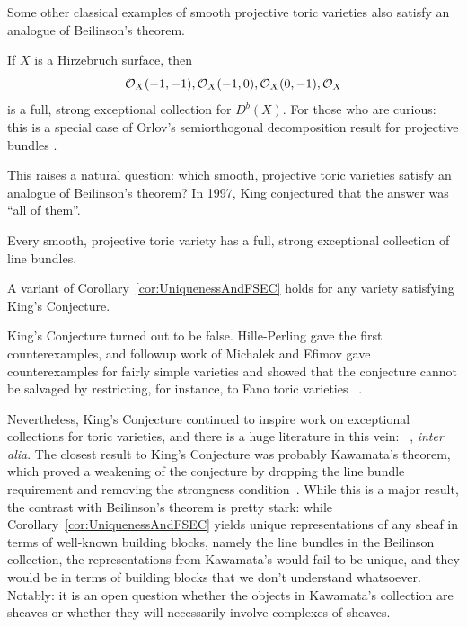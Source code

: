 \documentclass{amsart}
\begin{document}
Some other classical examples of smooth projective toric varieties also satisfy an analogue of Beilinson's theorem.
\begin{example}
If $X$ is a Hirzebruch surface, then
$$
{\mathcal O}_{X}(-1,-1),{\mathcal O}_{X}(-1,0), {\mathcal O}_{X}(0,-1),{\mathcal O}_{X}
$$
is a full, strong exceptional collection for $D^b(X)$.   For those who are curious: this is a special case of Orlov's semiorthogonal decomposition result for projective bundles \cite[Cor.~8.36]{Huybrechts2006}.
\end{example}

This raises a natural question:  which smooth, projective toric varieties satisfy an analogue of Beilinson's theorem?  In 1997, King conjectured that the answer was ``all of them''.

\begin{conj}[King, 1997]
    Every smooth, projective toric variety has a full, strong exceptional collection of line bundles.
\end{conj}

\begin{remark}
\label{rem:monad}
A variant of Corollary~\ref{cor:UniquenessAndFSEC} holds for any variety satisfying King's Conjecture. 
\end{remark} 

King's Conjecture turned out to be
false.  Hille-Perling gave the first counterexamples, and followup work of Michalek and Efimov gave counterexamples for fairly simple varieties and showed that the conjecture cannot be salvaged by restricting, for instance, to Fano toric varieties
~\cites{HP06, Michalek11a, Efimov14}.

Nevertheless, King's Conjecture
continued to inspire work on exceptional collections for toric
varieties, and there is a huge literature in this vein:
~\cites{ABK+20,
BFK19,BDL+20,BIL+26,BDM22,BT09,BH09,BO19,BW21,CM04,CM10,DLM09,Jerby15,Jerby17,Jerby20,Kawamata06,Kawamata13,LM11,OU13,PrabhuNaik17,Sanchez23,Uehara14},
\emph{inter alia}.  The closest result to King's Conjecture was probably Kawamata's theorem, which proved a weakening of the conjecture by dropping the line bundle requirement and removing the strongness condition~\cite{Kawamata06}.  While this is a major result, the contrast with Beilinson's theorem is pretty stark: while Corollary~\ref{cor:UniquenessAndFSEC} yields unique representations of any sheaf in terms of well-known building blocks, namely the line bundles in the Beilinson collection, the representations from Kawamata's would fail to be unique, and they would be in terms of building blocks that we don't understand whatsoever.  Notably: it is an open question whether the objects in Kawamata's collection are sheaves or whether they will necessarily involve complexes of sheaves.
\end{document}
